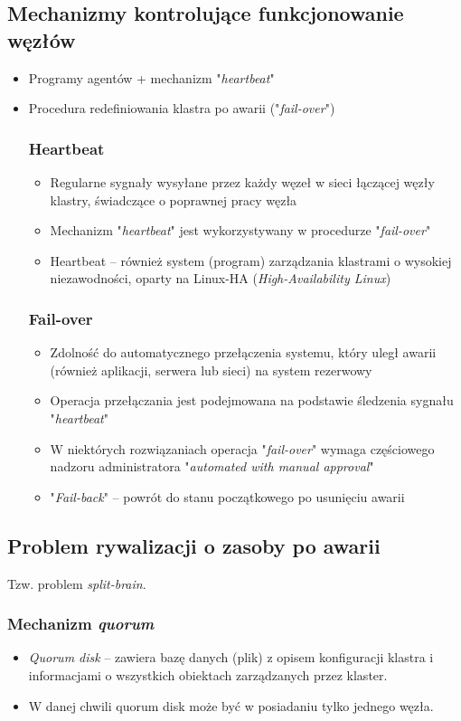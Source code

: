 		\subsection{Mechanizmy kontrolujące funkcjonowanie węzłów}
			\begin{itemize}
				\item Programy agentów + mechanizm "\emph{heartbeat}"
				\item Procedura redefiniowania klastra po awarii ("\emph{fail-over}")
				\subsubsection{Heartbeat}
					\begin{itemize}
						\item Regularne sygnały wysyłane przez każdy węzeł w sieci łączącej węzły klastry, świadczące o poprawnej pracy węzła
						\item Mechanizm "\emph{heartbeat}" jest wykorzystywany w procedurze "\emph{fail-over}"
						\item Heartbeat – również system (program) zarządzania klastrami o wysokiej niezawodności, oparty na Linux-HA (\textit{High-Availability Linux})
					\end{itemize}
				\subsubsection{Fail-over}
					\begin{itemize}
						\item Zdolność do automatycznego przełączenia systemu, który uległ awarii (również aplikacji, serwera lub sieci) na system rezerwowy
						\item Operacja przełączania jest podejmowana na podstawie śledzenia sygnału "\emph{heartbeat}"
						\item W niektórych rozwiązaniach operacja "\emph{fail-over}" wymaga częściowego nadzoru administratora "\textit{automated with manual approval}"
						\item "\emph{Fail-back}" – powrót do stanu początkowego po usunięciu awarii
					\end{itemize}
			\end{itemize}
		\subsection{Problem rywalizacji o zasoby po awarii}
			Tzw. problem \textit{split-brain}.
			\subsubsection{Mechanizm \textit{quorum}}
			\begin{itemize}
				\item \emph{Quorum disk} – zawiera bazę danych (plik) z opisem konfiguracji klastra i informacjami o wszystkich obiektach zarządzanych przez klaster.
				\item W danej chwili quorum disk może być w posiadaniu tylko jednego węzła.
			\end{itemize}
			
